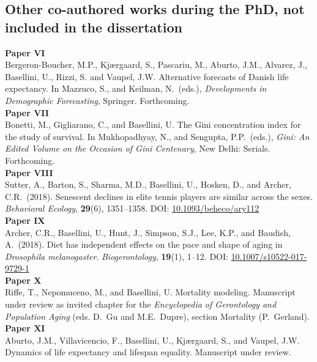 \documentclass[Thesis]{subfiles}
\begin{document}
\subsection*{Other co-authored works during the PhD, not included in the dissertation}
\medskip
\textbf{Paper VI}\\
Bergeron-Boucher, M.P., Kj{\ae}rgaard, S., Pascariu, M., Aburto, J.M., Alvarez, J., Basellini, U., Rizzi, S. and Vaupel, J.W. Alternative forecasts of Danish life expectancy. In Mazzuco, S., and Keilman, N.~(eds.), \textit{Developments in Demographic Forecasting}, Springer. Forthcoming.
\vspace{0.5cm}\\
\textbf{Paper VII}\\
Bonetti, M., Gigliarano, C., and Basellini, U. The Gini concentration index for the study of survival. In Mukhopadhyay, N., and Sengupta, P.P.~(eds.), \textit{Gini: An Edited Volume on the Occasion of Gini Centenary}, New Delhi: Serials. Forthcoming.
\vspace{0.5cm}\\
\textbf{Paper VIII}\\
Sutter, A., Barton, S., Sharma, M.D., Basellini, U., Hosken, D., and Archer, C.R.~(2018). Senescent declines in elite tennis players are similar across the sexes. \textit{Behavioral Ecology}, \textbf{29}(6), 1351--1358. DOI: \href{https://academic.oup.com/beheco/advance-article/doi/10.1093/beheco/ary112/5079311}{10.1093/beheco/ary112}
\vspace{0.5cm}\\
\textbf{Paper IX}\\
Archer, C.R., Basellini, U., Hunt, J., Simpson, S.J., Lee, K.P., and Baudish, A.~(2018). Diet has independent effects on the pace and shape of aging in \textit{Drosophila melanogaster}. \textit{Biogerontology}, \textbf{19}(1), 1--12. DOI: \href{https://link.springer.com/article/10.1007\%2Fs10522-017-9729-1}{10.1007/s10522-017-9729-1}
\vspace{0.5cm}\\
\textbf{Paper X}\\
Riffe, T., Nepomuceno, M., and Basellini, U. Mortality modeling. Manuscript under review as invited chapter for the \textit{Encyclopedia of Gerontology and Population Aging} (eds. D.~Gu and M.E.~Dupre), section Mortality (P.~Gerland).
\vspace{0.5cm}\\
\textbf{Paper XI}\\
Aburto, J.M., Villavicencio, F., Basellini, U., Kj{\ae}rgaard, S., and Vaupel, J.W. Dynamics of life expectancy and lifespan equality. Manuscript under review.
\end{document}
